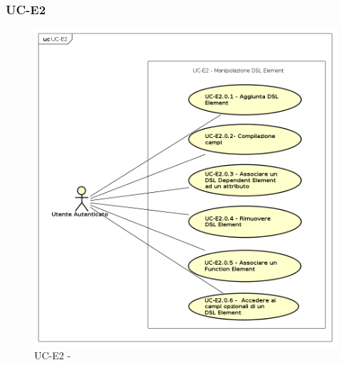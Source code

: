 \subsubsection{UC-E2}

    \begin{figure}[H]
      \begin{center}
        \includegraphics[width=12cm]{res/img/UCEditor/UC-E2.png}
      \caption{UC-E2 - }
      \end{center} 
    \end{figure}    
    
